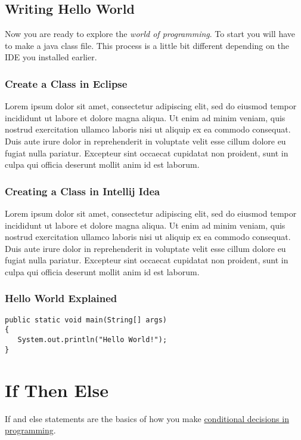 \documentclass{article}
\begin{document}
\subsection{Writing Hello World}
Now you are ready to explore the \emph{world of programming}. To start you will have
to make a java class file. This process is a little bit different depending on the IDE you installed earlier.

\subsubsection{Create a Class in Eclipse}
Lorem ipsum dolor sit amet, consectetur adipiscing elit, sed do eiusmod tempor incididunt ut labore et dolore magna aliqua. Ut enim ad minim veniam, quis nostrud exercitation ullamco laboris nisi ut aliquip ex ea commodo consequat. Duis aute irure dolor in reprehenderit in voluptate velit esse cillum dolore eu fugiat nulla pariatur. Excepteur sint occaecat cupidatat non proident, sunt in culpa qui officia deserunt mollit anim id est laborum.



\subsubsection{Creating a Class in Intellij Idea}
Lorem ipsum dolor sit amet, consectetur adipiscing elit, sed do eiusmod tempor incididunt ut labore et dolore magna aliqua. Ut enim ad minim veniam, quis nostrud exercitation ullamco laboris nisi ut aliquip ex ea commodo consequat. Duis aute irure dolor in reprehenderit in voluptate velit esse cillum dolore eu fugiat nulla pariatur. Excepteur sint occaecat cupidatat non proident, sunt in culpa qui officia deserunt mollit anim id est laborum.



\subsubsection{Hello World Explained}
\begin{lstlisting}
public static void main(String[] args)
{
   System.out.println("Hello World!");
}
\end{lstlisting}




\section{If Then Else}
If and else statements are the basics of how you make \href{https://wikipedia.org/wiki/Conditional_(computer_programming)}{conditional decisions in programming}.
\end{document}
